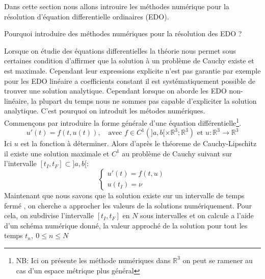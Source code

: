 \documentclass{article}
\newcommand{\R}{\mathbb{R}}
\newtheorem[M , nocut]{prop}{Proposition}[section]
\newtheorem[M]{propt}{Propriété}[section]
\newtheorem[L , nocut]{thm}{Théoreme}
\newtheorem[L]{cor}{Corollaire}
\begin{document}
Dans cette section nous allons introuire les méthodes numérique pour la résolution d'équation differentielle ordinaires (EDO). 
\begin{example}[Problématique]
    Pourquoi introduire des méthodes numériques pour la résolution des EDO ? 
\end{example}
Lorsque on étudie des équations differentielles la théorie nous permet sous certaines condition d'affirmer que la solution à un problème de Cauchy existe et est maximale. Cependant leur expressions explicite n'est pas garantie par exemple pour les EDO linéaire a coefficients constant il est systématiquement possible de trouver une solution analytique. Cependant lorsque on aborde les EDO non-linéaire, la plupart du temps nous ne sommes pas capable d'expliciter la solution analytique. C'est pourquoi on introduit les métodes numériques.\\
Commençons par introduire la forme générale d'une équation différentielle\footnote{NB: Ici on présente les méthode numériques dans $\R^3$ on peut se ramener au cas d'un espace métrique plus général}.
\[
    u'(t) = f(t,u(t)),\quad \text{avec } f\in C^1(]a,b[ \times \R^3 ;\R^3)\text{ et }u : \R^3 \to \R^3
\]
Ici $u$ est la fonction à déterminer. Alors d'après le théoreme de Cauchy-Lipschitz il existe une solution maximale et $C^1$ au problème de Cauchy suivant sur l'intervalle $[t_I,t_F] \subset ]a,b[ $:
\[
    \left\{\begin{array}{l}
        u'(t)=f(t,u)\\
        u(t_I) = \nu
    \end{array}\right.
\]
Maintenant que nous savons que la solution existe sur un intervalle de temps fermé , on cherche a approcher les valeurs de la solutions numériquement. Pour cela, on subdivise l'intervalle $[t_I,t_F]$ en $N$ sous intervalles et on calcule a l'aide d'un schéma numérique donné, la valeur approché de la solution pour tout les temps $t_n,\ 0\le n \le N$
\end{document}
